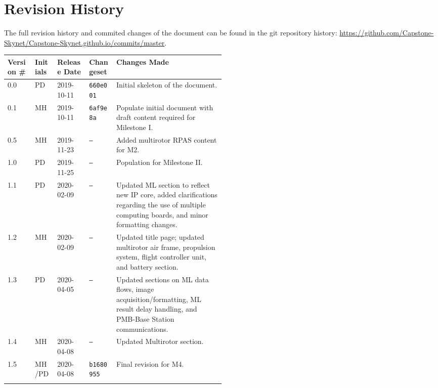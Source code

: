 \section*{Revision History}
The full revision history and commited changes of the document can be found in the git repository history: \href{https://github.com/Capstone-Skynet/Capstone-Skynet.github.io}{https://github.com/Capstone-Skynet/Capstone-Skynet.github.io/commits/master}.

\begin{table}[H]
\begin{tabular}{*{4}{l}p{0.5\linewidth}}
\hline
Version \# & Initials & Release Date & Changeset & Changes Made \\ \hline

0.0 & PD & 2019-10-11 & \texttt{660e001} & Initial skeleton of the document.\\
0.1 & MH & 2019-10-11 & \texttt{6af9e8a} & Populate initial document with draft content required for Milestone I.\\
0.5 & MH & 2019-11-23 & \texttt{--} & Added multirotor RPAS content for M2.\\
1.0 & PD & 2019-11-25 & \texttt{--} & Population for Milestone II.\\ 
1.1 & PD & 2020-02-09 & \texttt{--} & Updated ML section to reflect new IP core, added clarifications regarding the use of multiple computing boards, and minor formatting changes.\\ 
1.2 & MH & 2020-02-09 & \texttt{--} & Updated title page; updated multirotor air frame, propulsion system, flight controller unit, and battery section.\\ 
1.3 & PD & 2020-04-05 & \texttt{--} & Updated sections on ML data flows, image acquisition/formatting, ML result delay handling, and PMB-Base Station communications.\\ 
1.4 & MH & 2020-04-08 & \texttt{--} & Updated Multirotor section.\\ 
1.5 & MH/PD & 2020-04-08 & \texttt{b1680955} & Final revision for M4.\\
 & & & \\ \hline
\end{tabular}
\end{table}
